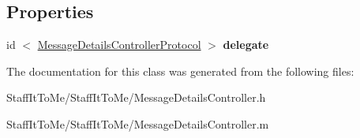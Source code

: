 \subsection*{\-Properties}
\begin{DoxyCompactItemize}
\item 
\hypertarget{interface_message_details_controller_a40d1b7b41b08f65a1266237f83eaccce}{
id\*
$<$ \hyperlink{protocol_message_details_controller_protocol-p}{\-Message\-Details\-Controller\-Protocol} $>$ {\bfseries delegate}}
\label{interface_message_details_controller_a40d1b7b41b08f65a1266237f83eaccce}

\end{DoxyCompactItemize}


\-The documentation for this class was generated from the following files\-:\begin{DoxyCompactItemize}
\item 
\-Staff\-It\-To\-Me/\-Staff\-It\-To\-Me/\-Message\-Details\-Controller.\-h\item 
\-Staff\-It\-To\-Me/\-Staff\-It\-To\-Me/\-Message\-Details\-Controller.\-m\end{DoxyCompactItemize}
